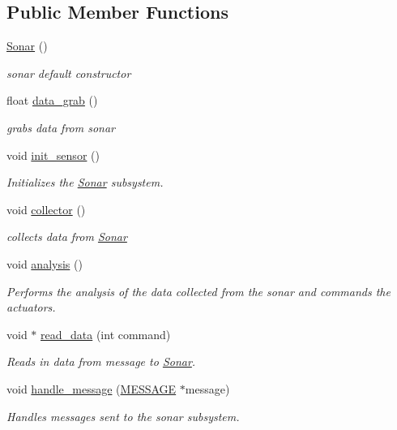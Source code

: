 \subsection*{Public Member Functions}
\begin{DoxyCompactItemize}
\item 
\hyperlink{classSonar_a71ef009d138f1e372fc35ca0cb6e85e2}{Sonar} ()
\begin{DoxyCompactList}\small\item\em sonar default constructor \end{DoxyCompactList}\item 
float \hyperlink{classSonar_aa4e807cbed15ce1d46ddcef05b6b59fb}{data\-\_\-grab} ()
\begin{DoxyCompactList}\small\item\em grabs data from sonar \end{DoxyCompactList}\item 
void \hyperlink{classSonar_af91d04cbc441084ba608a49c2be88d5b}{init\-\_\-sensor} ()
\begin{DoxyCompactList}\small\item\em Initializes the \hyperlink{classSonar}{Sonar} subsystem. \end{DoxyCompactList}\item 
void \hyperlink{classSonar_a38b0e409082be17e7098b2e471bab4a8}{collector} ()
\begin{DoxyCompactList}\small\item\em collects data from \hyperlink{classSonar}{Sonar} \end{DoxyCompactList}\item 
void \hyperlink{classSonar_a11a32c64528f8e69fdde4722f3b3bc7b}{analysis} ()
\begin{DoxyCompactList}\small\item\em Performs the analysis of the data collected from the sonar and commands the actuators. \end{DoxyCompactList}\item 
void $\ast$ \hyperlink{classSonar_a54f55470741873f333ad8af8a98affc8}{read\-\_\-data} (int command)
\begin{DoxyCompactList}\small\item\em Reads in data from message to \hyperlink{classSonar}{Sonar}. \end{DoxyCompactList}\item 
void \hyperlink{classSonar_a5f9b0f57b5a05b03b0dcb5ab830592ff}{handle\-\_\-message} (\hyperlink{SUBSYS__COMMANDS_8h_ad814416fc1a8c675bea2687d96088a8f}{M\-E\-S\-S\-A\-G\-E} $\ast$message)
\begin{DoxyCompactList}\small\item\em Handles messages sent to the sonar subsystem. \end{DoxyCompactList}\end{DoxyCompactItemize}
